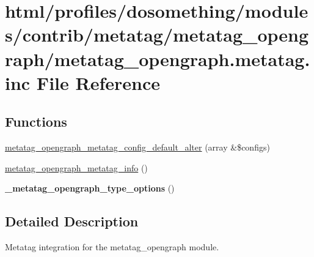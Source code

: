 \hypertarget{metatag__opengraph_8metatag_8inc}{
\section{html/profiles/dosomething/modules/contrib/metatag/metatag\_\-opengraph/metatag\_\-opengraph.metatag.inc File Reference}
\label{metatag__opengraph_8metatag_8inc}
}
\subsection*{Functions}
\begin{DoxyCompactItemize}
\item 
\hyperlink{metatag__opengraph_8metatag_8inc_a1169b9f6f5ea8ba75cd8ca9b59c0df03}{metatag\_\-opengraph\_\-metatag\_\-config\_\-default\_\-alter} (array \&\$configs)
\item 
\hyperlink{metatag__opengraph_8metatag_8inc_a27c524312c0109c7b448fa929f0588d3}{metatag\_\-opengraph\_\-metatag\_\-info} ()
\item 
\hypertarget{metatag__opengraph_8metatag_8inc_afe7799e94f60817209262de718c573da}{
{\bfseries \_\-metatag\_\-opengraph\_\-type\_\-options} ()}
\label{metatag__opengraph_8metatag_8inc_afe7799e94f60817209262de718c573da}

\end{DoxyCompactItemize}


\subsection{Detailed Description}
Metatag integration for the metatag\_\-opengraph module. 


